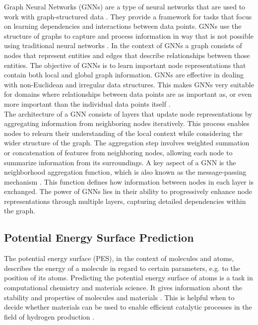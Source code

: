 Graph Neural Networks (GNNs) are a type of neural networks that are used to work with graph-structured data \cite{li2023predicting}. They provide a framework for tasks that focus on learning dependencies and interactions between data points. GNNs use the structure of graphs to capture and process information in way that is not possible using traditional neural networks \cite{duvenaud2015convolutional}. In the context of GNNs a graph consists of nodes that represent entities and edges that describe relationships between those entities. The objective of GNNs is to learn important node representations that contain both local and global graph information. \cite{wu_comprehensive_2021} GNNs are effective in dealing with non-Euclidean and irregular data structures. This makes GNNs very suitable for domains where relationships between data points are as important as, or even more important than the individual data points itself \cite{zhou_graph_2020}. \\

The architecture of a GNN consists of layers that update node representations by aggregating information from neighboring nodes iteratively. This process enables nodes to relearn their understanding of the local context while considering the wider structure of the graph. The aggregation step involves weighted summation or concatenation of features from neighboring nodes, allowing each node to summarize information from its surroundings. \cite{velickovic_everything_2023, xu_how_2019} A key aspect of a GNN is the neighborhood aggregation function, which is also known as the message-passing mechanism \cite{gasteiger_directional_2022}. This function defines how information between nodes in each layer is exchanged. The power of GNNs lies in their ability to progressively enhance node representations through multiple layers, capturing detailed dependencies within the graph. 

\subsection{Potential Energy Surface Prediction}
The potential energy surface (PES), in the context of molecules and atoms, describes the energy of a molecule in regard to certain parameters, e.g. to the position of its atoms.    
Predicting the potential energy surface of atoms is a task in computational chemistry and materials science. It gives information about the stability and properties of molecules and materials \cite{liu_computational_2023}. This is helpful when to decide whether materials can be used to enable efficient catalytic processes in the field of hydrogen production \cite{chen_waste-derived_2023}. 


